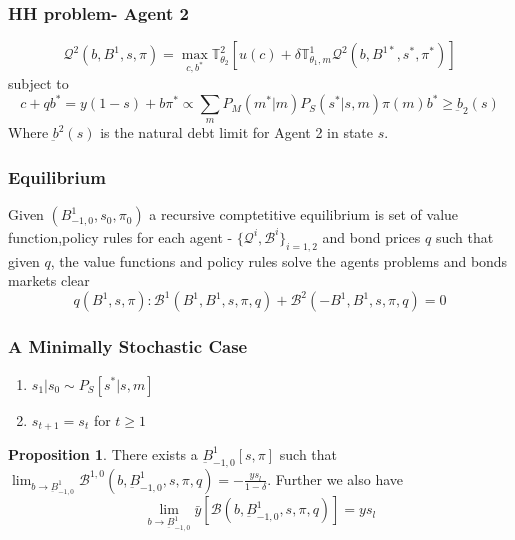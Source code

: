 \documentclass{beamer}
\theoremstyle{definition}
\newtheorem{proposition}{Proposition}%
\begin{document}
\begin{frame}
\frametitle{HH problem- Agent 2 }
\begin{equation}
\label{BEAgent2ValueFunction}
\mathcal{Q}^2(b,B^1,s,\pi)=\max_{c,b^*} { \mathbb{T}^2_{\theta_2} \left[u(c)+\delta \mathbb{T}^1_{\theta_1,m}\mathcal{Q}^2 (b,B^{1*},s^*,\pi^*)\right]}
\end{equation}
subject to
\begin{subequations}
\begin{equation}
c+qb^*=y(1-s)+b
\end{equation}
\begin{equation}
\pi^* \propto \sum_{m}{P_M(m^*|m)P_S(s^*|s,m)\pi(m)}
\end{equation}
\begin{equation}
b^* \geq \underbar{b}_2 (s)
\end{equation}
\end{subequations}
Where $\underbar{b}^2(s)$ is the natural debt limit for Agent 2 in state $s$. 
\end{frame}




\begin{frame}
\frametitle{Equilibrium}
Given $(B^{1}_{-1,0}, s_0, \pi_0)$ a recursive comptetitive equilibrium is set of value function,policy rules for each agent - $\{\mathcal{Q}^i,\mathcal{B}^i\}_{i=1,2}$ and bond prices $q$ such that given $q$, the value functions and policy rules solve the agents problems and bonds markets clear
\[q(B^1,s,\pi) : \mathcal{B}^1(B^1,B^1,s,\pi,q)+  \mathcal{B}^2(-B^1,B^1,s,\pi,q)=0\]
\end{frame}




\begin{frame}
\frametitle{A Minimally Stochastic Case}
\begin{enumerate}
	\item $s_1|s_0 \sim P_S[s^*|s,m]$
	\item $s_{t+1}=s_{t}$ for $t\geq1$ 
\end{enumerate}

\begin{proposition}
\label{propo-10}
There exists a $\underbar{B}^1_{-1,0}[s,\pi]$ such that $\lim_{b\to \underbar{B}^1_{-1,0}} \mathcal{B}^{1,0}(b,\underbar{B}^1_{-1,0},s,\pi,q) = -\frac{ys_l}{1-\delta}$. Further we also have 
\[\lim_{b \to \underbar{B}^1_{-1,0}}\bar{y}[\mathcal{B}(b,\underbar{B}^1_{-1,0},s,\pi,q)] = ys_l\]
\end{proposition}
\end{frame}
\end{document}
